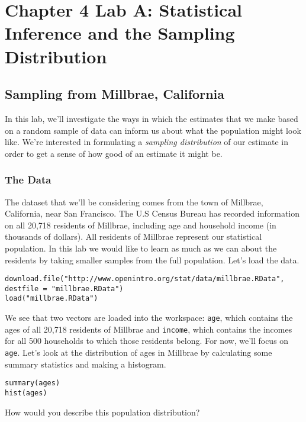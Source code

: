 \documentclass[11pt]{article}
\begin{document}
\section*{Chapter 4 Lab A: Statistical Inference and the Sampling Distribution}
\subsection*{Sampling from Millbrae, California}

In this lab, we'll investigate the ways in which the estimates that we make based on a random sample of data can inform us about what the population might look like.  We're interested in formulating a \emph{sampling distribution} of our estimate in order to get a sense of how good of an estimate it might be.

\subsubsection*{The Data}
The dataset that we'll be considering comes from the town of Millbrae, California, near San Francisco.  The U.S Census Bureau has recorded information on all 20,718 residents of Millbrae, including age and household income (in thousands of dollars).  All residents of Millbrae represent our statistical population.  In this lab we would like to learn as much as we can about the residents by taking smaller samples from the full population.  Let's load the data.

\begin{lstlisting}
download.file("http://www.openintro.org/stat/data/millbrae.RData", destfile = "millbrae.RData")
load("millbrae.RData")
\end{lstlisting}

We see that two vectors are loaded into the workspace: \texttt{age}, which contains the ages of all 20,718 residents of Millbrae and \texttt{income}, which contains the incomes for all 500 households to which those residents belong.  For now, we'll focus on \texttt{age}.  Let's look at the distribution of ages in Millbrae by calculating some summary statistics and making a histogram.

\begin{lstlisting}
summary(ages)
hist(ages)
\end{lstlisting}


\begin{exercise}
How would you describe this population distribution?
\end{exercise}
\end{document}
